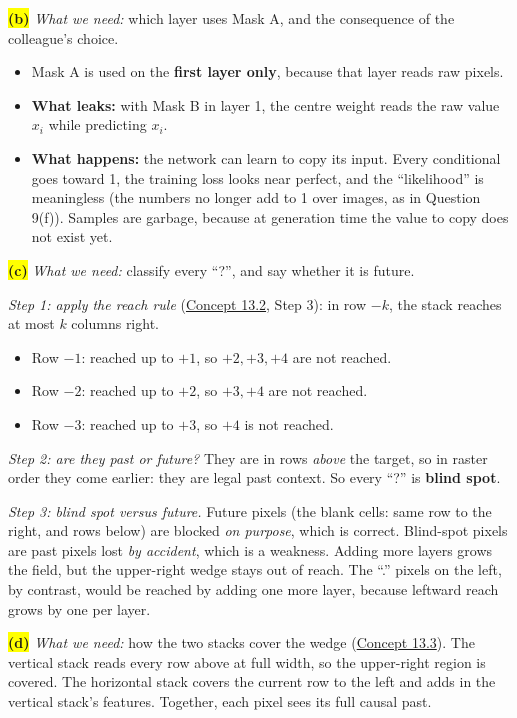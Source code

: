 \documentclass[12pt,a4paper]{article}
\begin{document}
\colorbox{yellow}{\textbf{(b)}} \emph{What we need:} which layer uses Mask A, and the consequence of the colleague's choice.
\begin{itemize}[nosep]
  \item Mask A is used on the \textbf{first layer only}, because that layer reads raw pixels.
  \item \textbf{What leaks:} with Mask B in layer 1, the centre weight reads the raw value $x_i$ while predicting $x_i$.
  \item \textbf{What happens:} the network can learn to copy its input. Every conditional goes toward 1, the training loss looks near perfect, and the ``likelihood'' is meaningless (the numbers no longer add to 1 over images, as in Question 9(f)). Samples are garbage, because at generation time the value to copy does not exist yet.
\end{itemize}

\colorbox{yellow}{\textbf{(c)}} \emph{What we need:} classify every ``?'', and say whether it is future.

\emph{Step 1: apply the reach rule} (\hyperref[c13-2]{Concept 13.2}, Step 3): in row $-k$, the stack reaches at most $k$ columns right.
\begin{itemize}[nosep]
  \item Row $-1$: reached up to $+1$, so $+2,+3,+4$ are not reached.
  \item Row $-2$: reached up to $+2$, so $+3,+4$ are not reached.
  \item Row $-3$: reached up to $+3$, so $+4$ is not reached.
\end{itemize}
\emph{Step 2: are they past or future?} They are in rows \emph{above} the target, so in raster order they come earlier: they are legal past context. So every ``?'' is \textbf{blind spot}.

\emph{Step 3: blind spot versus future.} Future pixels (the blank cells: same row to the right, and rows below) are blocked \emph{on purpose}, which is correct. Blind-spot pixels are past pixels lost \emph{by accident}, which is a weakness. Adding more layers grows the field, but the upper-right wedge stays out of reach. The ``.'' pixels on the left, by contrast, would be reached by adding one more layer, because leftward reach grows by one per layer.

\colorbox{yellow}{\textbf{(d)}} \emph{What we need:} how the two stacks cover the wedge (\hyperref[c13-3]{Concept 13.3}). The vertical stack reads every row above at full width, so the upper-right region is covered. The horizontal stack covers the current row to the left and adds in the vertical stack's features. Together, each pixel sees its full causal past.
\end{document}
